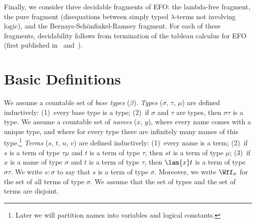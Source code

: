 Finally, we consider three decidable fragments of EFO:
the lambda-free fragment, the pure fragment
(disequations between simply typed $\lambda$-terms not
involving logic), and the Bernays-Sch\"onfinkel-Ramsey
fragment.  For each of these fragments, decidability
follows from termination of the tableau calculus for EFO
(first published in~\cite{BrownSmolkaBasic}
and~\cite{BrownSmolkaEFO}).

























\section{Basic Definitions}

We assume a countable set of \emph{base types}
($\beta$).  \emph{Types} ($\sigma$, $\tau$, $\mu$) are
defined inductively: (1)~every base type is a type;
(2)~if $\sigma$ and $\tau$ are types, then $\sigma\tau$
is a type.  We assume a countable set of \emph{names}
($x$, $y$), where every name comes with a unique type,
and where for every type there are infinitely many names of this 
type.\footnote{Later we will partition names into variables and logical constants.} \emph{Terms} ($s$, $t$, $u$, $v$)
are defined inductively: (1)~every name is a term;
(2)~if $s$ is a term of type $\tau\mu$ and $t$ is a
term of type $\tau$, then $st$ is a term of type $\mu$;
(3)~if $x$ is a name of type $\sigma$ and $t$ is a term
of type $\tau$, then $\lam{x}t$ is a term of type
$\sigma\tau$.  We write \emph{$s:\sigma$} to say that
$s$ is a term of type $\sigma$.  Moreover, we write
\emph{$\Wff_\sigma$} for the set of all terms of type
$\sigma$.  We assume that the set of types and the set of terms
are disjoint.

